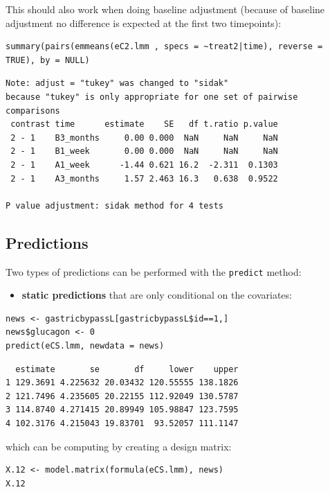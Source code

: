 \documentclass[12pt]{article}
\begin{document}
This should also work when doing baseline adjustment (because of
baseline adjustment no difference is expected at the first two
timepoints):
\lstset{language=r,label= ,caption= ,captionpos=b,numbers=none}
\begin{lstlisting}
summary(pairs(emmeans(eC2.lmm , specs = ~treat2|time), reverse = TRUE), by = NULL)
\end{lstlisting}

\begin{verbatim}
Note: adjust = "tukey" was changed to "sidak"
because "tukey" is only appropriate for one set of pairwise comparisons
 contrast time      estimate    SE   df t.ratio p.value
 2 - 1    B3_months     0.00 0.000  NaN     NaN     NaN
 2 - 1    B1_week       0.00 0.000  NaN     NaN     NaN
 2 - 1    A1_week      -1.44 0.621 16.2  -2.311  0.1303
 2 - 1    A3_months     1.57 2.463 16.3   0.638  0.9522

P value adjustment: sidak method for 4 tests
\end{verbatim}

\subsection{Predictions}
\label{sec:orgd28d46b}

Two types of predictions can be performed with the \texttt{predict} method:
\begin{itemize}
\item \textbf{static predictions} that are only conditional on the covariates:
\end{itemize}
\lstset{language=r,label= ,caption= ,captionpos=b,numbers=none}
\begin{lstlisting}
news <- gastricbypassL[gastricbypassL$id==1,]
news$glucagon <- 0
predict(eCS.lmm, newdata = news)
\end{lstlisting}

\begin{verbatim}
  estimate       se       df     lower    upper
1 129.3691 4.225632 20.03432 120.55555 138.1826
2 121.7496 4.235605 20.22155 112.92049 130.5787
3 114.8740 4.271415 20.89949 105.98847 123.7595
4 102.3176 4.215043 19.83701  93.52057 111.1147
\end{verbatim}


which can be computing by creating a design matrix:
\lstset{language=r,label= ,caption= ,captionpos=b,numbers=none}
\begin{lstlisting}
X.12 <- model.matrix(formula(eCS.lmm), news)
X.12
\end{lstlisting}
\end{document}
